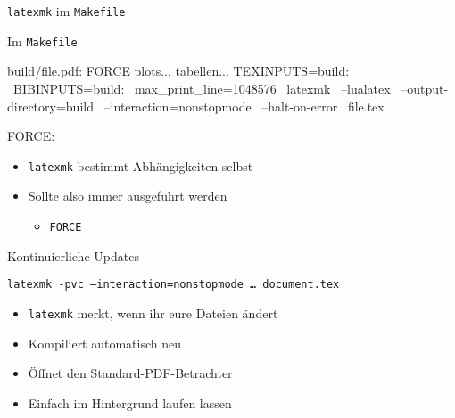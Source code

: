 \begin{frame}[fragile]{\texttt{latexmk} im \texttt{Makefile}}
  \begin{block}{Im \texttt{Makefile}}
    \begin{lstmake}
      build/file.pdf: FORCE plots... tabellen...
            TEXINPUTS=build: \
            BIBINPUTS=build: \
            max_print_line=1048576 \
          latexmk \
            --lualatex \
            --output-directory=build \
            --interaction=nonstopmode \
            --halt-on-error \
          file.tex

      FORCE:
    \end{lstmake}
  \end{block}

  \begin{itemize}
    \item \texttt{latexmk} bestimmt Abhängigkeiten selbst
    \item Sollte also immer ausgeführt werden
      \begin{itemize}
        \item \texttt{FORCE}
      \end{itemize}
  \end{itemize}
\end{frame}
\begin{frame}{Kontinuierliche Updates}
  \begin{center}
    \texttt{latexmk \alert{-pvc} --interaction=nonstopmode … document.tex}
  \end{center}
  \begin{itemize}
    \item \texttt{latexmk} merkt, wenn ihr eure Dateien ändert
    \item Kompiliert automatisch neu
    \item Öffnet den Standard-PDF-Betrachter
    \item Einfach im Hintergrund laufen lassen
  \end{itemize}
\end{frame}
